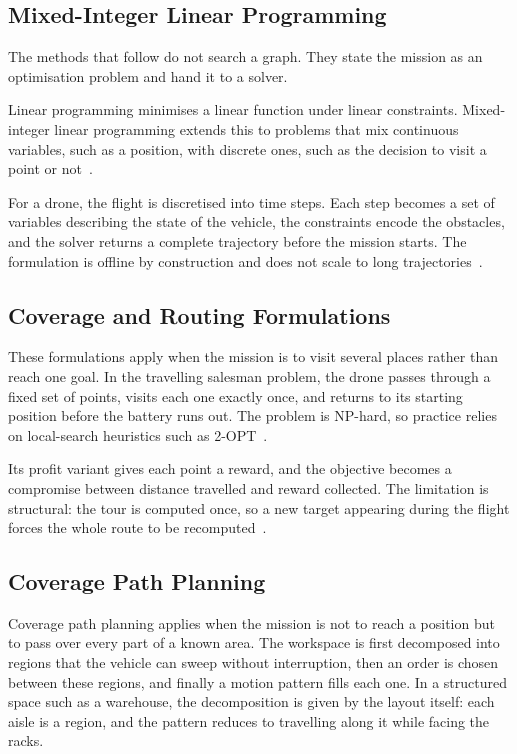 \subsection{Mixed-Integer Linear Programming}%
\label{subsec:nav:milp}

The methods that follow do not search a graph. They state the mission as an
optimisation problem and hand it to a solver.

Linear programming minimises a linear function under linear constraints.
Mixed-integer linear programming extends this to problems that mix continuous
variables, such as a position, with discrete ones, such as the decision to visit
a point or not~\cite{kumar2025comprehensive}.

For a drone, the flight is discretised into time steps. Each step becomes a set
of variables describing the state of the vehicle, the constraints encode the
obstacles, and the solver returns a complete trajectory before the mission
starts. The formulation is offline by construction and does not scale to long
trajectories~\cite{krayani2023goal}.

\subsection{Coverage and Routing Formulations}%
\label{subsec:nav:tsp}

These formulations apply when the mission is to visit several places rather than
reach one goal. In the travelling salesman problem, the drone passes through a
fixed set of points, visits each one exactly once, and returns to its starting
position before the battery runs out. The problem is NP-hard, so practice relies
on local-search heuristics such as 2-OPT~\cite{krayani2023goal}.

Its profit variant gives each point a reward, and the objective becomes a
compromise between distance travelled and reward collected. The limitation is
structural: the tour is computed once, so a new target appearing during the
flight forces the whole route to be recomputed~\cite{krayani2023goal}.

\subsection{Coverage Path Planning}%
\label{subsec:nav:cpp}

Coverage path planning applies when the mission is not to reach a position but to
pass over every part of a known area. The workspace is first decomposed into
regions that the vehicle can sweep without interruption, then an order is chosen
between these regions, and finally a motion pattern fills each one. In a
structured space such as a warehouse, the decomposition is given by the layout
itself: each aisle is a region, and the pattern reduces to travelling along it
while facing the racks.

